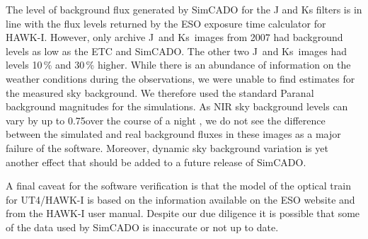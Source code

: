 The level of background flux generated by SimCADO for the J and Ks filters is in line with the flux levels returned by the ESO exposure time calculator for HAWK-I. However, only archive J~and Ks~images from 2007 had background levels as low as the ETC and SimCADO. The other two J~and Ks~images had levels 10\,\% and 30\,\% higher. While there is an abundance of information on the weather conditions during the observations, we were unable to find estimates for the measured sky background. We therefore used the standard Paranal background magnitudes for the simulations. As NIR sky background levels can vary by up to 0.75\m over the course of a night \citep{moreels08}, we do not see the difference between the simulated and real background fluxes in these images as a major failure of the software. Moreover, dynamic sky background variation is yet another effect that should be added to a future release of SimCADO.

A final caveat for the software verification is that the model of the optical train for UT4/HAWK-I is based on the information available on the ESO website and from the HAWK-I user manual. Despite our due diligence it is possible that some of the data used by SimCADO is inaccurate or not up to date. 

